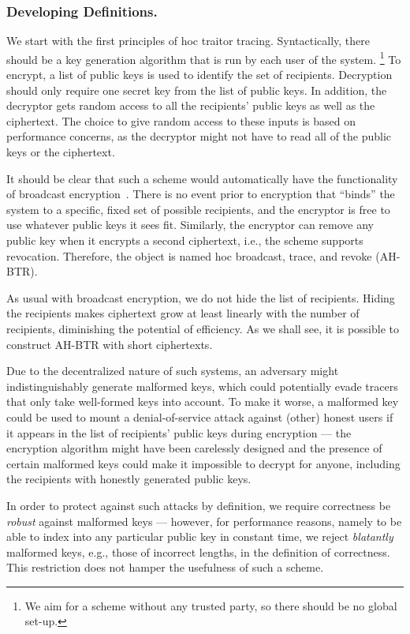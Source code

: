 \subsubsection{Developing Definitions.}
We start with the first principles of \ad hoc traitor tracing.
Syntactically, there should be a key generation algorithm that is run by each user of the system.%
\footnote{We aim for a scheme without any trusted party, so there should be no global set-up.}
To encrypt, a list of public keys is used to identify the set of recipients.
Decryption should only require one secret key from the list of public keys.
In addition, the decryptor gets random access to all the recipients' public keys as well as the ciphertext.
The choice to give random access to these inputs is based on performance concerns, as the decryptor might not have to read all of the public keys or the ciphertext.

It should be clear that such a scheme would automatically have the functionality of broadcast encryption~\cite{C:FiaNao93}.
There is no event prior to encryption that ``binds'' the system to a specific, fixed set of possible recipients, and the encryptor is free to use whatever public keys it sees fit.
Similarly, the encryptor can remove any public key when it encrypts a second ciphertext, i.e., the scheme supports revocation.
Therefore, the object is named \ad hoc broadcast, trace, and revoke (AH-BTR).

As usual with broadcast encryption, we do not hide the list of recipients.
Hiding the recipients makes ciphertext
\WideNarrow{\pagebreak[3]}{}%
grow at least linearly with the number of recipients,
diminishing the potential of efficiency.
As we shall see, it is possible to construct AH-BTR with short ciphertexts.

Due to the decentralized nature of such systems,
an adversary might indistinguishably generate malformed keys,
which could potentially evade tracers that only take well-formed keys into account.
To make it worse, a malformed key could be used to mount a denial-of-service attack against (other) honest users if it appears in the list of recipients' public keys during encryption ---
the encryption algorithm might have been carelessly designed and the presence of certain malformed keys could make it impossible to decrypt for anyone, including the recipients with honestly generated public keys.

In order to protect against such attacks by definition,
we require correctness be \emph{robust} against malformed keys ---
however, for performance reasons, namely to be able to index into any particular public key in constant time,
we reject \emph{blatantly} malformed keys, e.g., those of incorrect lengths, in the definition of correctness.
This restriction does not hamper the usefulness of such a scheme.

